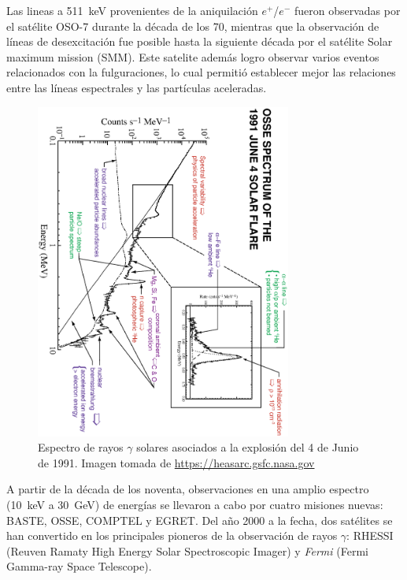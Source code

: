 Las lineas a \SI{511}{\kilo\electronvolt} provenientes de la aniquilación $e^{+}$/$e^{-}$ fueron observadas por el satélite OSO-7 durante la década de los \num{70}, mientras que la observación de líneas de desexcitación fue posible hasta la siguiente década por el satélite Solar maximum mission (SMM). Este satelite además logro observar varios eventos relacionados con la fulguraciones, lo cual permitió establecer mejor las relaciones entre las líneas espectrales y las partículas aceleradas.

\begin{figure}
        \centering
        \includegraphics[width=0.75\textwidth,angle=90]{gamma-espectro.eps}
        \caption{Espectro de rayos $\gamma$ solares asociados a la explosión del \num{4} de Junio de \num{1991}. Imagen tomada de \url{https://heasarc.gsfc.nasa.gov}}
        \label{fig:gamma-espectro}
\end{figure}

A partir de la década de los noventa, observaciones en una amplio espectro (\SI{10}{\kilo\electronvolt} a \SI{30}{\giga\electronvolt}) de energías se llevaron a cabo por cuatro misiones nuevas: BASTE, OSSE, COMPTEL y EGRET. Del año \num{2000} a la fecha, dos satélites se han convertido en los principales pioneros de la observación de rayos $\gamma$: RHESSI (Reuven Ramaty High Energy Solar Spectroscopic Imager) y \emph{Fermi} (Fermi Gamma-ray Space Telescope).

